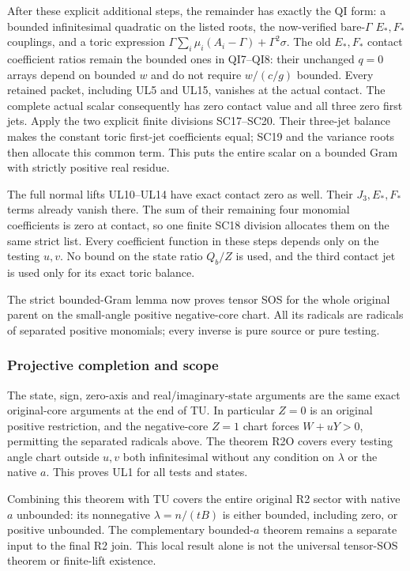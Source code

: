 After these explicit additional steps, the remainder has exactly
the QI form: a bounded infinitesimal quadratic on the listed
roots, the now-verified bare-$\Gamma$ $E_*,F_*$ couplings, and
a toric expression
$\Gamma\sum_i\mu_i(A_i-\Gamma)+\Gamma^2\sigma$.
The old $E_*,F_*$ contact coefficient ratios remain the bounded
ones in QI7--QI8: their unchanged $q=0$ arrays depend on bounded
$w$ and do not require $w/(c/g)$ bounded.
Every retained packet, including UL5 and UL15, vanishes at the
actual contact. The complete actual scalar consequently has zero
contact value and all three zero first jets. Apply the two
explicit finite divisions SC17--SC20. Their three-jet balance
makes the constant toric first-jet coefficients equal; SC19 and
the variance roots then allocate this common term. This puts
the entire scalar on a bounded Gram with strictly positive
real residue.

The full normal lifts UL10--UL14 have exact contact zero as well.
Their $J_3,E_*,F_*$ terms already vanish there. The sum of their
remaining four monomial coefficients is zero at contact, so one
finite SC18 division allocates them on the same strict list.
Every coefficient function in these steps depends only on the
testing $u,v$. No bound on the state ratio $Q_b/Z$ is used, and
the third contact jet is used only for its exact toric balance.

The strict bounded-Gram lemma now proves tensor SOS for the whole
original parent on the small-angle positive negative-core chart.
All its radicals are radicals of separated positive monomials;
every inverse is pure source or pure testing.

\subsubsection*{Projective completion and scope}

The state, sign, zero-axis and real/imaginary-state arguments are
the same exact original-core arguments at the end of TU.
In particular $Z=0$ is an original positive restriction, and the
negative-core $Z=1$ chart forces $W+uY>0$, permitting the
separated radicals above. The theorem R2O covers every testing
angle chart outside $u,v$ both infinitesimal without any
condition on $\lambda$ or the native $a$. This proves UL1 for
all tests and states.

Combining this theorem with TU covers the entire original R2
sector with native $a$ unbounded: its nonnegative
$\lambda=n/(tB)$ is either bounded, including zero, or positive
unbounded. The complementary bounded-$a$ theorem remains a
separate input to the final R2 join. This local result alone is
not the universal tensor-SOS theorem or finite-lift existence.

